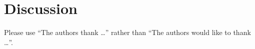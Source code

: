\documentclass[journal=jcisd8,manuscript=article]{achemso}
\begin{document}
\section{Discussion}



\begin{acknowledgement}

Please use ``The authors thank \ldots'' rather than ``The
authors would like to thank \ldots''.



\end{acknowledgement}

\begin{suppinfo}



\end{suppinfo}


\end{document}
